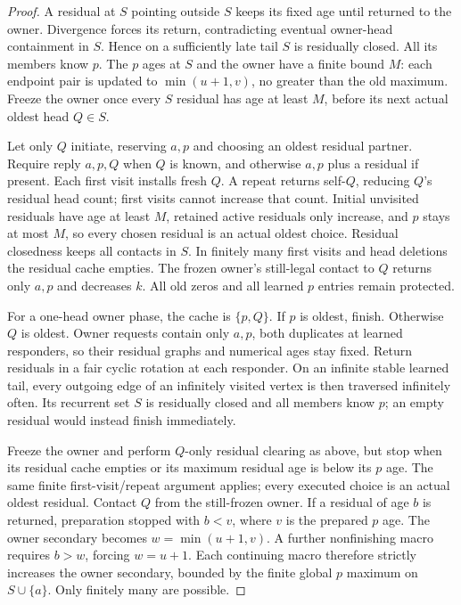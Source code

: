 \documentclass[11pt]{article}
\begin{document}
\begin{proof}
A residual at $S$ pointing outside $S$ keeps its fixed age until
returned to the owner. Divergence forces its return, contradicting
eventual owner-head containment in $S$. Hence on a sufficiently
late tail $S$ is residually closed. All its members know $p$.
The $p$ ages at $S$ and the owner have a finite bound $M$:
each endpoint pair is updated to $\min(u+1,v)$, no greater than
the old maximum. Freeze the owner once every $S$ residual has
age at least $M$, before its next actual oldest head $Q\in S$.

Let only $Q$ initiate, reserving $a,p$ and choosing an oldest
residual partner. Require reply $a,p,Q$ when $Q$ is known,
and otherwise $a,p$ plus a residual if present. Each first
visit installs fresh $Q$. A repeat returns self-$Q$, reducing
$Q$'s residual head count; first visits cannot increase that
count. Initial unvisited residuals have age at least $M$,
retained active residuals only increase, and $p$ stays at most
$M$, so every chosen residual is an actual oldest choice.
Residual closedness keeps all contacts in $S$. In finitely many
first visits and head deletions the residual cache empties.
The frozen owner's still-legal contact to $Q$ returns only
$a,p$ and decreases $k$. All old zeros and all learned $p$
entries remain protected.

For a one-head owner phase, the cache is $\{p,Q\}$. If $p$
is oldest, finish. Otherwise $Q$ is oldest. Owner requests
contain only $a,p$, both duplicates at learned responders,
so their residual graphs and numerical ages stay fixed.
Return residuals in a fair cyclic rotation at each responder.
On an infinite stable learned tail, every outgoing edge of an
infinitely visited vertex is then traversed infinitely often.
Its recurrent set $S$ is residually closed and all members know
$p$; an empty residual would instead finish immediately.

Freeze the owner and perform $Q$-only residual clearing as above,
but stop when its residual cache empties or its maximum residual
age is below its $p$ age. The same finite first-visit/repeat
argument applies; every executed choice is an actual oldest
residual. Contact $Q$ from the still-frozen owner. If a residual
of age $b$ is returned, preparation stopped with $b<v$, where
$v$ is the prepared $p$ age. The owner secondary becomes
$w=\min(u+1,v)$. A further nonfinishing macro requires $b>w$,
forcing $w=u+1$. Each continuing macro therefore strictly
increases the owner secondary, bounded by the finite global
$p$ maximum on $S\cup\{a\}$. Only finitely many are possible.


\end{proof}
\end{document}
